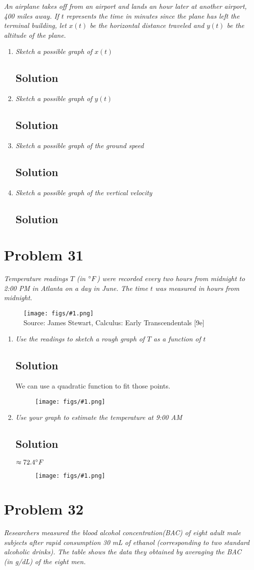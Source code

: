 \documentclass[11pt]{article}
\newcommand{\soln}{\subsection*}
\newcommand{\qn}{\textit}
\newcommand{\imagesource}[1]{{\footnotesize Source: #1}}
\newcommand{\imgqn}[1]{
	\begin{figure}[H]
		\centering
		\texttt{[image: figs/\#1.png]}\\
		\imagesource{James Stewart, Calculus: Early Transcendentals [9e]}
	\end{figure}
}
\newcommand{\imgsoln}[1]{
	\begin{figure}[H]
		\centering
		\texttt{[image: figs/\#1.png]}
	\end{figure}
}
\begin{document}
\qn{An airplane takes off from an airport and lands an hour later at another airport, 400 miles away. If $t$ represents the time in minutes since the plane has left the terminal building, let $x(t)$ be the horizontal distance traveled and $y(t)$ be the altitude of the plane.}

\begin{enumerate}
	\item \qn{Sketch a possible graph of $x(t)$}
	\soln{Solution}
	
	\item \qn{Sketch a possible graph of $y(t)$}
	\soln{Solution}
	
	\item \qn{Sketch a possible graph of the ground speed}
	\soln{Solution}
	
	\item \qn{Sketch a possible graph of the vertical velocity}
	\soln{Solution}
\end{enumerate}

\section*{Problem 31}

\qn{Temperature readings $T$ (in $\degree F$) were recorded every two hours from midnight to 2:00 PM in Atlanta on a day in June. The time $t$ was measured in hours from midnight.}

\imgqn{1.1.31}

\begin{enumerate}
	\item \qn{Use the readings to sketch a rough graph of $T$ as a function of $t$}
	\soln{Solution}
	We can use a quadratic function to fit those points.
	\imgsoln{1.1.31-ans.a}
	
	\item \qn{Use your graph to estimate the temperature at 9:00 AM}
	\soln{Solution}
	$\approx 72.4 \degree F$
	\imgsoln{1.1.31-ans.b}
\end{enumerate}

\section*{Problem 32}

\qn{Researchers measured the blood alcohol concentration(BAC) of eight adult male subjects after rapid consumption 30 mL of ethanol (corresponding to two standard alcoholic drinks). The table shows the data they obtained by averaging the BAC (in g/dL) of the eight men.}
\end{document}
